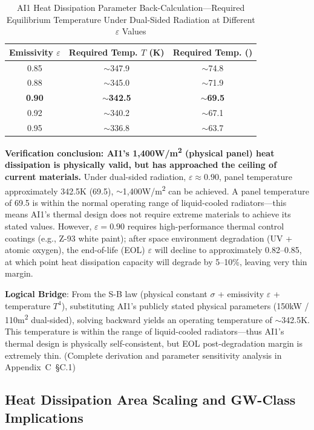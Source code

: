 \begin{table}[H]
\centering
\caption{AI1 Heat Dissipation Parameter Back-Calculation---Required Equilibrium Temperature Under Dual-Sided Radiation at Different $\varepsilon$ Values}
\label{tab:ai1_temperature}
\begin{tabular}{ccc}
\toprule
\textbf{Emissivity $\varepsilon$} & \textbf{Required Temp. $T$ (K)} & \textbf{Required Temp. (\unitC{})} \\
\midrule
0.85 & $\sim$347.9 & $\sim$74.8 \\
0.88 & $\sim$345.0 & $\sim$71.9 \\
\textbf{0.90} & \textbf{$\sim$342.5} & \textbf{$\sim$69.5} \\
0.92 & $\sim$340.2 & $\sim$67.1 \\
0.95 & $\sim$336.8 & $\sim$63.7 \\
\bottomrule
\end{tabular}
\end{table}

\textbf{Verification conclusion: AI1's 1,400\;W/m\textsuperscript{2} (physical panel) heat dissipation is physically valid, but has approached the ceiling of current materials.} Under dual-sided radiation, $\varepsilon\approx 0.90$, panel temperature approximately 342.5\;K (69.5\unitC{}), $\sim$1,400\;W/m\textsuperscript{2} can be achieved. A panel temperature of 69.5\unitC{} is within the normal operating range of liquid-cooled radiators---this means AI1's thermal design does not require extreme materials to achieve its stated values. However, $\varepsilon=0.90$ requires high-performance thermal control coatings (e.g., Z-93 white paint); after space environment degradation (UV + atomic oxygen), the end-of-life (EOL) $\varepsilon$ will decline to approximately 0.82--0.85, at which point heat dissipation capacity will degrade by 5--10\%, leaving very thin margin\cite{nasa2024sst,nasa1993thermal}.

\textbf{Logical Bridge}: From the S-B law (physical constant $\sigma$ + emissivity $\varepsilon$ + temperature $T^4$), substituting AI1's publicly stated physical parameters (150\;kW / 110\;m\textsuperscript{2} dual-sided), solving backward yields an operating temperature of $\sim$342.5\;K. This temperature is within the range of liquid-cooled radiators---thus AI1's thermal design is physically self-consistent, but EOL post-degradation margin is extremely thin. (Complete derivation and parameter sensitivity analysis in Appendix~C~\S C.1)

\subsection{Heat Dissipation Area Scaling and GW-Class Implications}

